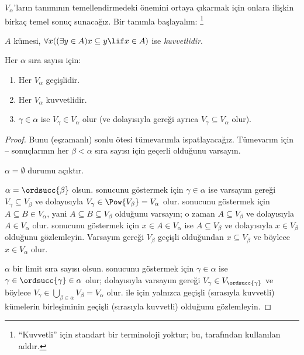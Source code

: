 \documentclass[../../../include/open-logic-section]{subfiles}
\begin{document}

$V_\alpha$'ların tanımının temellendirmedeki önemini ortaya çıkarmak için
onlara ilişkin birkaç temel sonuç sunacağız. Bir tanımla başlayalım:
\footnote{``Kuvvetli'' için standart bir terminoloji yoktur; bu,
\citet{ButtonLT1} tarafından kullanılan addır.}
\begin{defn}
	$A$ kümesi, $\forall x((\exists y \in A)x \subseteq y \lif x \in A)$
	ise \emph{kuvvetlidir}.
\end{defn}
\begin{lem}
Her $\alpha$ sıra sayısı için:
\begin{enumerate}
	\item{} Her $V_\alpha$ geçişlidir.
	\item{} Her $V_\alpha$ kuvvetlidir.
	\item{} $\gamma \in \alpha$ ise $V_\gamma
	\in V_\alpha$ olur (ve dolayısıyla  gereği ayrıca
	$V_\gamma\subseteq V_\alpha$ olur).
\end{enumerate}
\end{lem}

\begin{proof}
Bunu (eşzamanlı) sonlu ötesi tümevarımla ispatlayacağız. Tümevarım için
-- sonuçlarının her $\beta<\alpha$
sıra sayısı için geçerli olduğunu varsayın.

$\alpha=\emptyset$ durumu açıktır.

$\alpha=\ordsucc{\beta}$ olsun.  sonucunu göstermek için
$\gamma\in\alpha$ ise varsayım gereği $V_\gamma\subseteq V_\beta$ ve
dolayısıyla $V_\gamma\in\Pow{V_\beta}=V_\alpha$ olur.
 sonucunu göstermek için
$A\subseteq B\in V_\alpha$, yani $A\subseteq B\subseteq V_\beta$
olduğunu varsayın; o zaman $A\subseteq V_\beta$ ve dolayısıyla
$A\in V_\alpha$ olur.  sonucunu göstermek için
$x\in A\in V_\alpha$ ise $A\subseteq V_\beta$ ve dolayısıyla
$x\in V_\beta$ olduğunu gözlemleyin. Varsayım gereği $V_\beta$ geçişli
olduğundan $x\subseteq V_\beta$ ve böylece $x\in V_\alpha$ olur.

$\alpha$ bir limit sıra sayısı olsun.  sonucunu göstermek
için $\gamma\in\alpha$ ise
$\gamma\in\ordsucc{\gamma}\in\alpha$ olur; dolayısıyla varsayım gereği
$V_\gamma\in V_{\ordsucc{\gamma}}$ ve böylece
$V_\gamma\in\bigcup_{\beta\in\alpha}V_\beta=V_\alpha$ olur.
 ile  için yalnızca geçişli
(sırasıyla kuvvetli) kümelerin birleşiminin geçişli (sırasıyla kuvvetli)
olduğunu gözlemleyin.
\end{proof}
\end{document}
